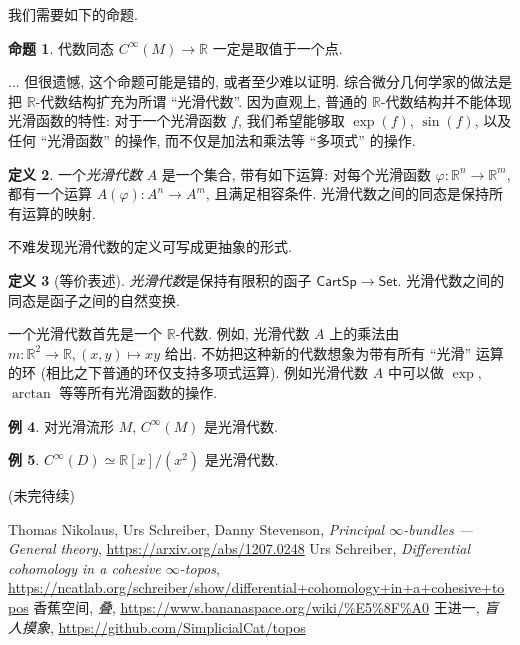 \documentclass{article}
\theoremstyle{definition}
\newtheorem{definition}{定义}[section]
\newtheorem{prop}[definition]{命题}
\newtheorem{example}[definition]{例}
\newcommand{\CartSp}{\mathsf{CartSp}}
\newcommand{\Set}{\mathsf{Set}}
\begin{document}
	我们需要如下的命题.
	\begin{prop}
		代数同态 $C^\infty (M)\to\mathbb{R}$ 一定是取值于一个点.
	\end{prop}
	... 但很遗憾, 这个命题可能是错的, 或者至少难以证明. 综合微分几何学家的做法是把 $\mathbb{R}$-代数结构扩充为所谓 ``光滑代数''.
	因为直观上, 普通的 $\mathbb{R}$-代数结构并不能体现光滑函数的特性: 对于一个光滑函数 $f$, 我们希望能够取 $\exp(f)$, $\sin(f)$, 以及任何 ``光滑函数'' 的操作, 而不仅是加法和乘法等 ``多项式'' 的操作.
	
	\begin{definition}
		一个\emph{光滑代数} $A$ 是一个集合, 带有如下运算: 对每个光滑函数 $\varphi\colon\mathbb{R}^n\to\mathbb{R}^m$, 都有一个运算 $A(\varphi)\colon A^n\to A^m$, 且满足相容条件. 光滑代数之间的同态是保持所有运算的映射.
	\end{definition}
	
	不难发现光滑代数的定义可写成更抽象的形式.
	
	\addtocounter{definition}{-1}
	\begin{definition}[等价表述]
		\emph{光滑代数}是保持有限积的函子 $\CartSp\to\Set$. 光滑代数之间的同态是函子之间的自然变换.
	\end{definition}
	
	一个光滑代数首先是一个 $\mathbb{R}$-代数. 例如, 光滑代数 $A$ 上的乘法由 $m\colon \mathbb{R}^2\to\mathbb{R},(x,y)\mapsto xy$ 给出. 不妨把这种新的代数想象为带有所有 ``光滑'' 运算的环 (相比之下普通的环仅支持多项式运算). 例如光滑代数 $A$ 中可以做 $\exp$, $\arctan$ 等等所有光滑函数的操作.
	
	\begin{example}
		对光滑流形 $M$, $C^\infty (M)$ 是光滑代数.
	\end{example}
	
	\begin{example}
		$C^\infty (D)\simeq \mathbb{R}[x]/(x^2)$ 是光滑代数.
	\end{example}
	
	(未完待续)
	
	
	
	\begin{thebibliography}{9}
		Thomas Nikolaus, Urs Schreiber, Danny Stevenson, \emph{Principal $\infty$-bundles --- General theory}, \url{https://arxiv.org/abs/1207.0248}
		Urs Schreiber, \emph{Differential cohomology in a cohesive $\infty$-topos}, \url{https://ncatlab.org/schreiber/show/differential+cohomology+in+a+cohesive+topos}
		 香蕉空间, \emph{叠}, \url{https://www.bananaspace.org/wiki/%E5%8F%A0}
		王进一, \emph{盲人摸象},
		\url{https://github.com/SimplicialCat/topos}
	\end{thebibliography}
	
\end{document}
